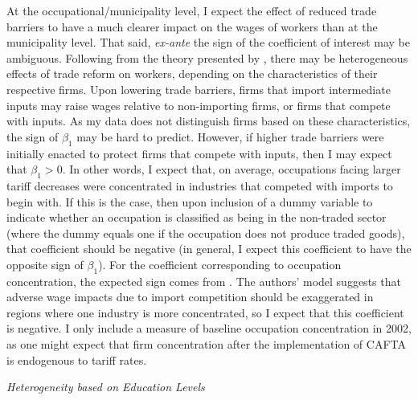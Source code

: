 \documentclass[12pt]{article}
\begin{document}
At the occupational/municipality level, I expect the effect of reduced trade barriers to have a 
much clearer impact on the wages of workers than at the municipality level. That said, 
\textit{ex-ante} the sign of the coefficient of interest may be ambiguous. Following from the 
theory presented by \citet{amiti}, there may be heterogeneous effects of trade reform on workers,
depending on the characteristics of their respective firms. Upon lowering trade barriers, firms 
that import intermediate inputs may raise wages relative to non-importing firms, or firms that
compete with inputs. As my data does not distinguish firms based on these characteristics, the sign
of $\beta_1$ may be hard to predict. However, if higher trade barriers were initially enacted to
protect firms that compete with inputs, then I may expect that $\beta_1>0$. In other words, I expect
that, on average, occupations facing larger tariff decreases were concentrated in industries that
competed with imports to begin with. If this is the case, then upon inclusion of a dummy variable
to indicate whether an occupation is classified as being in the non-traded sector (where
the dummy equals one if the occupation does not produce traded goods), that coefficient
should be negative (in general, I expect this coefficient to have the opposite sign of $\beta_1$).
For the coefficient corresponding to occupation concentration, the expected sign comes from
\citet{holmes1}. The authors' model suggests that adverse wage impacts due to import competition 
should be exaggerated in regions where one industry is more concentrated, so I expect that
this coefficient is negative. I only include a measure of baseline occupation concentration in 2002,
as one might expect that firm concentration after the implementation of CAFTA is endogenous to 
tariff rates.

\textit{Heterogeneity based on Education Levels}
\end{document}
